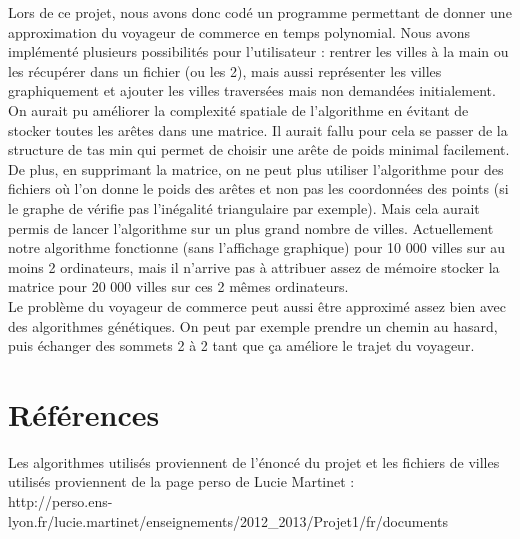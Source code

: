 \documentclass[a4paper,11pt]{article}
\begin{document}
Lors de ce projet, nous avons donc codé un programme permettant de donner une approximation du voyageur de commerce en temps polynomial. Nous avons implémenté plusieurs possibilités pour l'utilisateur : rentrer les villes à la main ou les récupérer dans un fichier (ou les 2), mais aussi représenter les villes graphiquement et ajouter les villes traversées mais non demandées initialement.\\
On aurait pu améliorer la complexité spatiale de l'algorithme en évitant de stocker toutes les arêtes dans une matrice. Il aurait fallu pour cela se passer de la structure de tas min qui permet de choisir une arête de poids minimal facilement. De plus, en supprimant la matrice, on ne peut plus utiliser l'algorithme pour des fichiers où l'on donne le poids des arêtes et non pas les coordonnées des points (si le graphe de vérifie pas l'inégalité triangulaire par exemple). Mais cela aurait permis de lancer l'algorithme sur un plus grand nombre de villes. Actuellement notre algorithme fonctionne (sans l'affichage graphique) pour 10 000 villes sur au moins 2 ordinateurs, mais il n'arrive pas à attribuer assez de mémoire stocker la matrice pour 20 000 villes sur ces 2 mêmes ordinateurs.\\
Le problème du voyageur de commerce peut aussi être approximé assez bien avec des algorithmes génétiques. On peut par exemple prendre un chemin au hasard, puis échanger des sommets 2 à 2 tant que ça améliore le trajet du voyageur.


\section{Références}

Les algorithmes utilisés proviennent de l'énoncé du projet et les fichiers de villes utilisés proviennent de la page perso de Lucie Martinet : \\
http://perso.ens-lyon.fr/lucie.martinet/enseignements/2012_2013/Projet1/fr/documents
\end{document}

